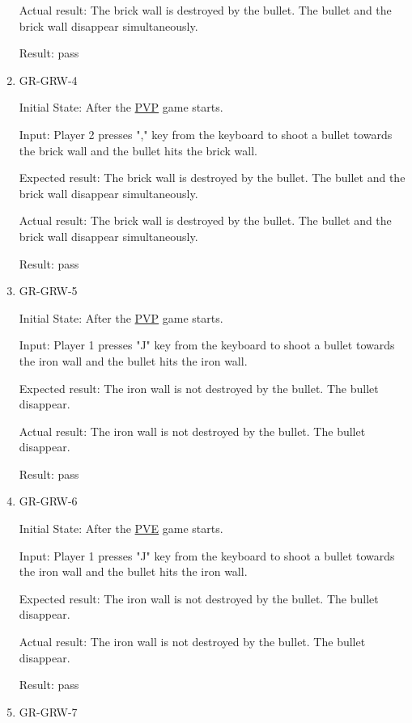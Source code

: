 \documentclass[12pt, titlepage]{article}
\begin{document}
\begin{enumerate}
Actual result: The brick wall is destroyed by the bullet. The bullet and the brick wall disappear simultaneously.

Result: pass

\item{GR-GRW-4\\}
					
Initial State: After the \underline{PVP} game starts. 
					
Input: Player 2 presses "," key from the keyboard to shoot a bullet towards the brick wall and the bullet hits the brick wall.
					
Expected result: The brick wall is destroyed by the bullet. The bullet and the brick wall disappear simultaneously.
					
Actual result: The brick wall is destroyed by the bullet. The bullet and the brick wall disappear simultaneously.

Result: pass




\item{GR-GRW-5\\}
					
Initial State: After the \underline{PVP} game starts. 
					
Input: Player 1 presses "J" key from the keyboard to shoot a bullet towards the iron wall and the bullet hits the iron wall.
					
Expected result: The iron wall is not destroyed by the bullet. The bullet disappear.
					
Actual result: The iron wall is not destroyed by the bullet. The bullet disappear.

Result: pass

\item{GR-GRW-6\\}
					
Initial State: After the \underline{PVE} game starts. 
					
Input: Player 1 presses "J" key from the keyboard to shoot a bullet towards the iron wall and the bullet hits the iron wall.
					
Expected result: The iron wall is not destroyed by the bullet. The bullet disappear.
					
Actual result: The iron wall is not destroyed by the bullet. The bullet disappear.

Result: pass

\item{GR-GRW-7\\}
					

\end{enumerate}
\end{document}
